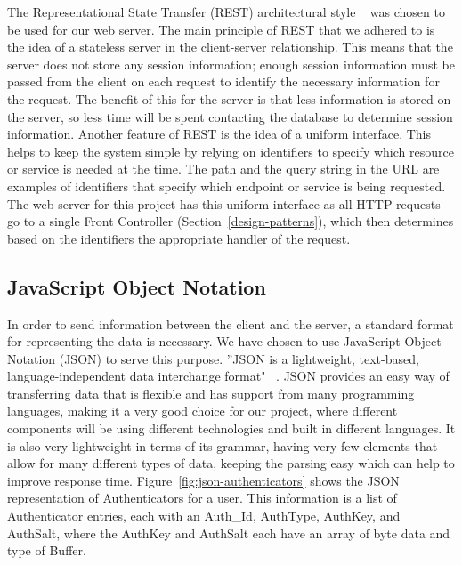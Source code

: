 \documentclass[12pt]{report}
\let\Oldsubsection\subsection
\renewcommand{\subsection}{\FloatBarrier\Oldsubsection}
\begin{document}
The Representational State Transfer (REST) architectural style ~\autocite{RESTARCHSTYLE} was chosen to be used
for our web server. The main principle of REST that we adhered to is the idea of a stateless
server in the client-server relationship. This means that the server does not store any session
information; enough session information must be passed from the client on each request to
identify the necessary information for the request. The benefit of this for the server is that less
information is stored on the server, so less time will be spent contacting the database to
determine session information. Another feature of REST is the idea of a uniform interface. This
helps to keep the system simple by relying on identifiers to specify which resource or service is
needed at the time. The path and the query string in the URL are examples of identifiers that
specify which endpoint or service is being requested. The web server for this project has this
uniform interface as all HTTP requests go to a single Front Controller (Section~\ref{design-patterns}), which
then determines based on the identifiers the appropriate handler of the request.

\subsection{JavaScript Object Notation} \label{javascript-object-notation}


In order to send information between the client and the server, a standard format for
representing the data is necessary. We have chosen to use JavaScript Object Notation (JSON) to
serve this purpose. ''JSON is a lightweight, text-based, language-independent data interchange
format" ~\autocite{JSONREF}. JSON provides an easy way of transferring data that is flexible and has support
from many programming languages, making it a very good choice for our project, where
different components will be using different technologies and built in different languages. It is
also very lightweight in terms of its grammar, having very few elements that allow for many
different types of data, keeping the parsing easy which can help to improve response time.
Figure~\ref{fig:json-authenticators} shows the JSON representation of Authenticators for a
user. This information is a list of Authenticator entries, each with an Auth\_Id, AuthType,
AuthKey, and AuthSalt, where the AuthKey and AuthSalt each have an array of byte data and type
of Buffer.
\end{document}
